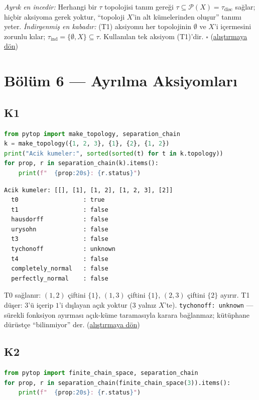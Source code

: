 \emph{Ayrık en incedir:} Herhangi bir $\tau$ topolojisi tanım gereği
$\tau\subseteq\mathcal{P}(X)=\tau_{\mathrm{disc}}$ sağlar; hiçbir
aksiyoma gerek yoktur, ``topoloji $X$'in alt kümelerinden oluşur''
tanımı yeter. \emph{İndirgenmiş en kabadır:} (T1) aksiyomu her
topolojinin $\emptyset$ ve $X$'i içermesini zorunlu kılar;
$\tau_{\mathrm{ind}}=\{\emptyset,X\}\subseteq\tau$. Kullanılan tek
aksiyom (T1)'dir. $\square$
\hfill(\hyperref[ex:ch04:T2]{alıştırmaya dön})

\section{Bölüm 6 --- Ayrılma Aksiyomları}

\subsection*{K1}\label{sol:ch06:K1}

\begin{lstlisting}[language=Python]
from pytop import make_topology, separation_chain
k = make_topology({1, 2, 3}, {1}, {2}, {1, 2})
print("Acik kumeler:", sorted(sorted(t) for t in k.topology))
for prop, r in separation_chain(k).items():
    print(f"  {prop:20s}: {r.status}")
\end{lstlisting}

\begin{lstlisting}[style=output, caption={Çıktı}]
Acik kumeler: [[], [1], [1, 2], [1, 2, 3], [2]]
  t0                  : true
  t1                  : false
  hausdorff           : false
  urysohn             : false
  t3                  : false
  tychonoff           : unknown
  t4                  : false
  completely_normal   : false
  perfectly_normal    : false
\end{lstlisting}

T0 sağlanır: $(1,2)$ çiftini $\{1\}$, $(1,3)$ çiftini $\{1\}$,
$(2,3)$ çiftini $\{2\}$ ayırır. T1 düşer: $3$'ü içerip $1$'i dışlayan
açık yoktur ($3$ yalnız $X$'te). \texttt{tychonoff: unknown} ---
sürekli fonksiyon ayırması açık-küme taramasıyla karara bağlanmaz;
kütüphane dürüstçe ``bilinmiyor'' der.
\hfill(\hyperref[ex:ch06:K1]{alıştırmaya dön})

\subsection*{K2}\label{sol:ch06:K2}

\begin{lstlisting}[language=Python]
from pytop import finite_chain_space, separation_chain
for prop, r in separation_chain(finite_chain_space(3)).items():
    print(f"  {prop:20s}: {r.status}")
\end{lstlisting}

